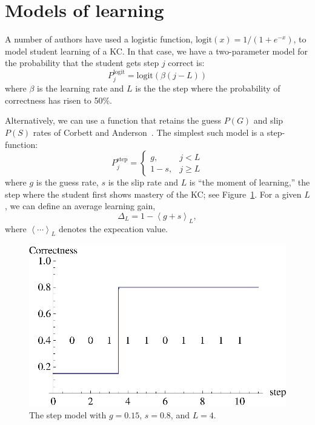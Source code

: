 \documentclass[11pt,letterpaper]{article}
\begin{document}
\section{Models of learning}

A number of authors have used a logistic function, 
$\mathrm{logit}(x)=1/\left(1+e^{-x}\right)$, to 
model student learning of a KC.  In that case, we have a two-parameter
model for the probability that the student gets step $j$ correct is:
%
\begin{equation}
               P_j^\mathrm{logit} = \mathrm{logit}\left(\beta (j-L)\right)
\end{equation}
%
where $\beta$ is the learning rate and $L$ is 
the the step where the probability of correctness has risen to 50\%.

Alternatively, we can use a function that retains the 
guess $P(G)$ and slip $P(S)$ rates of Corbett and 
Anderson~\cite{anderson}.
The simplest such model is a step-function:
%
\begin{equation}
               P_j^\mathrm{step} = \left\{\begin{array}{cc}
                                       g,& j<L\\
				       1-s,& j\ge L
                                    \end{array}\right. \label{step}
\end{equation}
%
where $g$ is the guess rate, $s$ is the slip rate and 
$L$ is ``the moment of learning,'' the step where the student
first shows mastery of the KC; see Figure~\ref{stepf}.
For a given $L$, we can define an average learning gain,
%
\begin{equation}
         \Delta_L = 1- \left\langle g+s \right\rangle_L ,
\end{equation}
%
where $\left\langle \cdots \right\rangle_L$ denotes the
expecation value.
\begin{figure}
\includegraphics{step.eps}
\caption{The step model with $g=0.15$, $s=0.8$, and $L=4$.}
         \label{stepf}
\end{figure}
\end{document}
